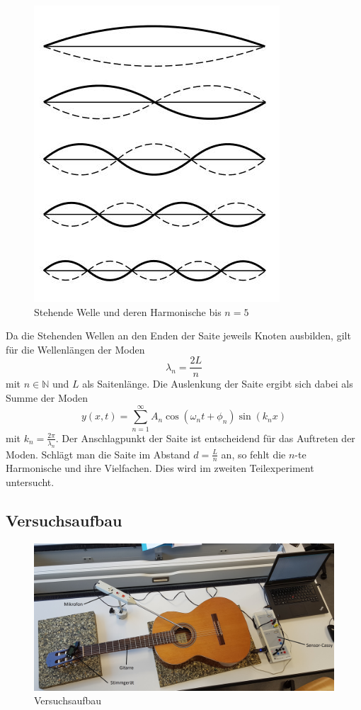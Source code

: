 \begin{figure}[h]
	\centering
	\includegraphics{bilder/StehendeWelle.jpg}
	\caption{Stehende Welle und deren Harmonische bis $n=5$}
\end{figure}

Da die Stehenden Wellen an den Enden der Saite jeweils Knoten ausbilden, gilt für die Wellenlängen der Moden
$$\lambda_n = \frac{2L}n$$
mit $n\in \mathbb N$ und $L$ als Saitenlänge. Die Auslenkung der Saite ergibt sich dabei als Summe der Moden
$$y(x,t) = \sum_{n=1}^\infty A_n \cos(\omega_nt + \phi_n)\sin(k_nx)$$
mit $k_n = \frac{2\pi}{\lambda_n}$. Der Anschlagpunkt der Saite ist entscheidend für das Auftreten der Moden. Schlägt man die Saite im Abstand $d=\frac Ln$ an, so fehlt die $n$-te Harmonische und ihre Vielfachen. Dies wird im zweiten Teilexperiment untersucht.


\subsection{Versuchsaufbau}

\begin{figure}[h]
	\centering
	\includegraphics[width=\linewidth]{bilder/gitarre_beschriftet.jpg}
	\caption{Versuchsaufbau}
	\label{aufbauGitarreExp}
\end{figure}

